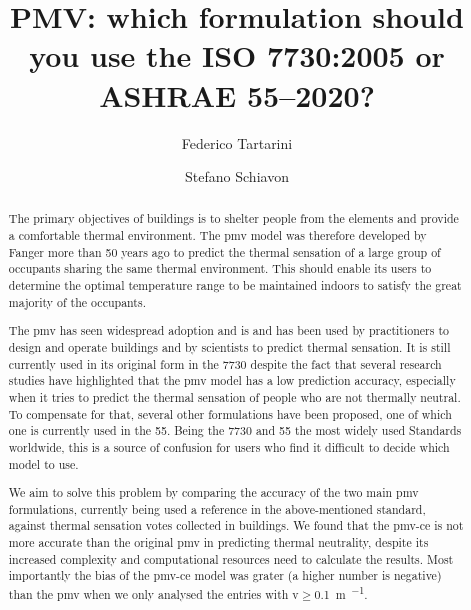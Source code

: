 \begin{frontmatter}

    \title{PMV: which formulation should you use the ISO 7730:2005 or ASHRAE 55--2020?}

    \author[label1,label2]{Federico Tartarini}
    \author[label3]{Stefano Schiavon}

    \address[label1]{Berkeley Education Alliance for Research in Singapore, Singapore}
    \address[label2]{Heat and Health Research Incubator, Faculty of Health and Medicine, University of Sydney, Sydney, AU}
    \address[label3]{Center for the Built Environment, University of California, Berkeley, CA, USA}


    \begin{abstract}
        The primary objectives of buildings is to shelter people from the elements and provide a comfortable thermal environment.
        The \ac{pmv} model was therefore developed by Fanger more than 50 years ago to predict the thermal sensation of a large group of occupants sharing the same thermal environment.
        This should enable its users to determine the optimal temperature range to be maintained indoors to satisfy the great majority of the occupants.

        The \ac{pmv} has seen widespread adoption and is and has been used by practitioners to design and operate buildings and by scientists to predict thermal sensation.
        It is still currently used in its original form in the \gls{7730} despite the fact that several research studies have highlighted that the \ac{pmv} model has a low prediction accuracy, especially when it tries to predict the thermal sensation of people who are not thermally neutral.
        To compensate for that, several other formulations have been proposed, one of which one is currently used in the \gls{55}.
        Being the \gls{7730} and \gls{55} the most widely used Standards worldwide, this is a source of confusion for users who find it difficult to decide which model to use.

        We aim to solve this problem by comparing the accuracy of the two main \ac{pmv} formulations, currently being used a reference in the above-mentioned standard, against  thermal sensation votes collected in buildings.
        We found that the \gls{pmv-ce} is not more accurate than the original \ac{pmv} in predicting thermal neutrality, despite its increased complexity and computational resources need to calculate the results.
        Most importantly the bias of the \gls{pmv-ce} model was grater (a higher number is negative) than the \ac{pmv} when we only analysed the entries with \ac{v}$\geq$\qty{0.1}{\m\per\sec}.


\end{abstract}
\end{frontmatter}
